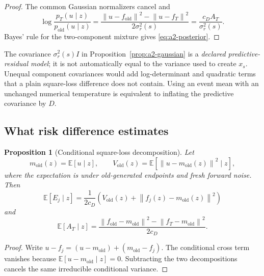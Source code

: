 \documentclass[11pt,a4paper]{article}
\newcommand{\E}{\mathbb{E}}
\newcommand{\norm}[1]{\left\lVert #1 \right\rVert}
\theoremstyle{plain}
\newtheorem{proposition}[theorem]{Proposition}
\theoremstyle{definition}
\begin{document}
\begin{proof}
The common Gaussian normalizers cancel and
\[
\log\frac{p_T(u\mid z)}{p_{\mathrm{old}}(u\mid z)}
=
\frac{
  \norm{u-f_{\mathrm{old}}}^2-\norm{u-f_T}^2
}{2\sigma_r^2(s)}
=
\frac{c_DA_T}{\sigma_r^2(s)}.
\]
Bayes' rule for the two-component mixture gives \eqref{eq:a2-posterior}.
\end{proof}

The covariance $\sigma_r^2(s)I$ in Proposition~\ref{prop:a2-gaussian} is a \emph{declared
predictive-residual model}; it is not automatically equal to the variance used to create $x_s$.
Unequal component covariances would add log-determinant and quadratic terms that a plain
square-loss difference does not contain.  Using an event mean with an unchanged numerical
temperature is equivalent to inflating the predictive covariance by $D$.

\subsection{What risk difference estimates}

\begin{proposition}[Conditional square-loss decomposition]
\label{prop:a2-risk-decomposition}
Let
\begin{equation}
m_{\mathrm{old}}(z)=\E[u\mid z],
\qquad
V_{\mathrm{old}}(z)
=
\E\!\left[
  \norm{u-m_{\mathrm{old}}(z)}^2\mid z
\right],
\label{eq:a2-conditional-mean}
\end{equation}
where the expectation is under old-generated endpoints and fresh forward noise.  Then
\begin{equation}
\E[E_j\mid z]
=
\frac{1}{2c_D}
\left(
  V_{\mathrm{old}}(z)
  +\norm{f_j(z)-m_{\mathrm{old}}(z)}^2
\right)
\label{eq:a2-bias-variance}
\end{equation}
and
\begin{equation}
\E[A_T\mid z]
=
\frac{
  \norm{f_{\mathrm{old}}-m_{\mathrm{old}}}^2
  -\norm{f_T-m_{\mathrm{old}}}^2
}{2c_D}.
\label{eq:a2-expected-advantage}
\end{equation}
\end{proposition}

\begin{proof}
Write
$u-f_j=(u-m_{\mathrm{old}})+(m_{\mathrm{old}}-f_j)$.  The conditional cross term vanishes because
$\E[u-m_{\mathrm{old}}\mid z]=0$.  Subtracting the two decompositions cancels the same
irreducible conditional variance.
\end{proof}
\end{document}

